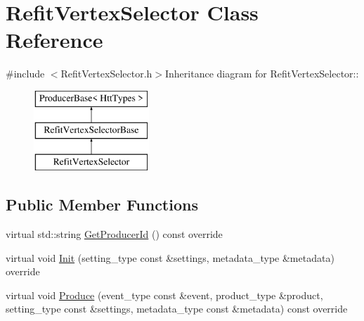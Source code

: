 \hypertarget{classRefitVertexSelector}{
\section{RefitVertexSelector Class Reference}
\label{classRefitVertexSelector}
}


{\ttfamily \#include $<$RefitVertexSelector.h$>$}Inheritance diagram for RefitVertexSelector::\begin{figure}[H]
\begin{center}
\leavevmode
\includegraphics[height=3cm]{classRefitVertexSelector}
\end{center}
\end{figure}
\subsection*{Public Member Functions}
\begin{DoxyCompactItemize}
\item 
virtual std::string \hyperlink{classRefitVertexSelector_a2e1b9024235b200be777bbde120574da}{GetProducerId} () const override
\item 
virtual void \hyperlink{classRefitVertexSelector_a3d8920d82d12c7de736a798b683b6d7f}{Init} (setting\_\-type const \&settings, metadata\_\-type \&metadata) override
\item 
virtual void \hyperlink{classRefitVertexSelector_a2fa81d07f81c40a39d5dffc4d19e9fb8}{Produce} (event\_\-type const \&event, product\_\-type \&product, setting\_\-type const \&settings, metadata\_\-type const \&metadata) const override
\end{DoxyCompactItemize}


